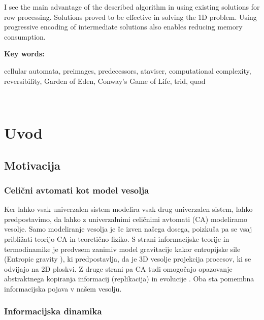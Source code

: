 \documentclass[12pt,a4paper,openany,twoside]{book}
\begin{document}
I see the main advantage of the described algorithm
in using existing solutions for row processing.
Solutions proved to be effective in solving the 1D problem.
Using progressive encoding of intermediate solutions
also enables reducing memory consumption.

\vspace{1.3cm}
\noindent
{\large \bf Key words:}

\vspace{0.5cm}
\noindent
cellular automata, preimages, predecessors, ataviser, computational complexity, reversibility, Garden of Eden, Conway's Game of Life, trid, quad
\newpage

\ \thispagestyle{empty}
\newpage


\chapter{Uvod}

\section{Motivacija}

\subsection{Celični avtomati kot model vesolja}

Ker lahko vsak univerzalen sistem modelira vsak drug univerzalen sistem, lahko predpostavimo,
da lahko z univerzalnimi celičnimi avtomati (CA) modeliramo vesolje. Samo modeliranje vesolja
je še izven našega dosega, poizkuša pa se vsaj približati teorijo CA in teoretično fiziko.
S strani informacijske teorije in termodinamike je predvsem zanimiv model gravitacije
kakor entropijske sile (Entropic gravity \cite{Verlinde2010}), ki predpostavlja, da je
3D vesolje projekcija procesov, ki se odvijajo na 2D ploskvi. Z druge strani pa CA tudi omogočajo
opazovanje abstraktnega kopiranja informacij (replikacija) in evolucije \cite{Salzberg2004}.
Oba sta pomembna informacijska pojava v našem vesolju.

\subsection{Informacijska dinamika}
\end{document}
